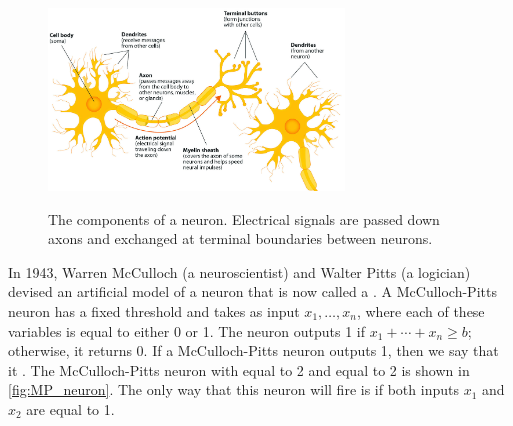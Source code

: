 \begin{figure}[h]
\centering
\mySfFamily
\includegraphics[width = 0.7\textwidth]{../images_CMYK/components_of_neuron}\\[4ex]
\caption{The components of a neuron. Electrical signals are passed down axons and exchanged at terminal boundaries between neurons.}
\label{fig:components_of_neuron}
\end{figure}

In 1943, Warren McCulloch (a neuroscientist) and Walter Pitts (a logician) devised an artificial model of a neuron that is now called a . A McCulloch-Pitts neuron has a fixed threshold  and takes as input   $x_1, \ldots, x_n$, where each of these variables is equal to either 0 or 1. The neuron outputs 1 if $x_1 + \cdots + x_n \geq b$; otherwise, it returns 0. If a McCulloch-Pitts neuron outputs 1, then we say that it . The McCulloch-Pitts neuron with  equal to 2 and  equal to 2 is shown in \autoref{fig:MP_neuron}. The only way that this neuron will fire is if both inputs $x_1$ and $x_2$ are equal to 1.\\

\begin{note}\end{note}

